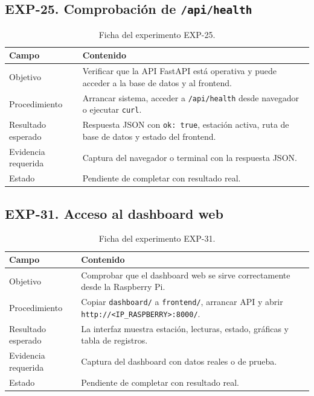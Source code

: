 \subsection{EXP-25. Comprobación de \texttt{/api/health}}

\begin{table}[H]
\centering
\renewcommand{\arraystretch}{1.25}
\small
\begin{tabular}{|p{}|p{}|}
\hline
\rowcolor{gray!20}
\textbf{Campo} & \textbf{Contenido} \\
\hline
Objetivo & Verificar que la API FastAPI está operativa y puede acceder a la base de datos y al frontend. \\
\hline
Procedimiento & Arrancar sistema, acceder a \texttt{/api/health} desde navegador o ejecutar \texttt{curl}. \\
\hline
Resultado esperado & Respuesta JSON con \texttt{ok: true}, estación activa, ruta de base de datos y estado del frontend. \\
\hline
Evidencia requerida & Captura del navegador o terminal con la respuesta JSON. \\
\hline
Estado & Pendiente de completar con resultado real. \\
\hline
\end{tabular}
\caption{Ficha del experimento EXP-25.}
\label{tab:ficha_exp_25}
\end{table}

\subsection{EXP-31. Acceso al dashboard web}

\begin{table}[H]
\centering
\renewcommand{\arraystretch}{1.25}
\small
\begin{tabular}{|p{}|p{}|}
\hline
\rowcolor{gray!20}
\textbf{Campo} & \textbf{Contenido} \\
\hline
Objetivo & Comprobar que el dashboard web se sirve correctamente desde la Raspberry Pi. \\
\hline
Procedimiento & Copiar \texttt{dashboard/} a \texttt{frontend/}, arrancar API y abrir \texttt{http://<IP\_RASPBERRY>:8000/}. \\
\hline
Resultado esperado & La interfaz muestra estación, lecturas, estado, gráficas y tabla de registros. \\
\hline
Evidencia requerida & Captura del dashboard con datos reales o de prueba. \\
\hline
Estado & Pendiente de completar con resultado real. \\
\hline
\end{tabular}
\caption{Ficha del experimento EXP-31.}
\label{tab:ficha_exp_31}
\end{table}

